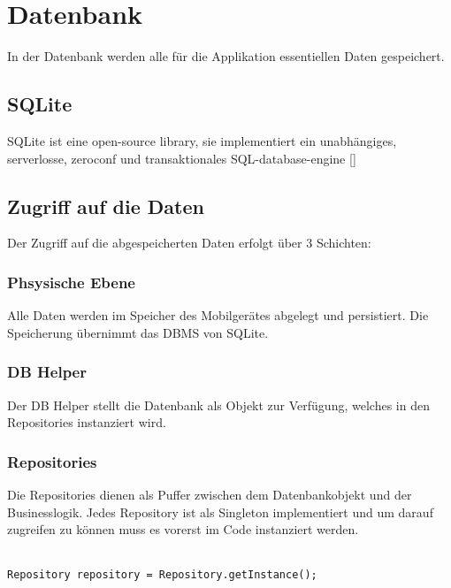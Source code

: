 \documentclass[FIPLY_base.tex]{subfiles}
\begin{document}
\section{Datenbank}

In der Datenbank werden alle für die Applikation essentiellen Daten gespeichert.

\subsection{SQLite}
SQLite ist eine open-source library, sie implementiert ein unabhängiges, serverlosse, zeroconf und transaktionales SQL-database-engine [\cite{dbSQLite}]


\subsection{Zugriff auf die Daten}
Der Zugriff auf die abgespeicherten Daten erfolgt über 3 Schichten:

\subsubsection{Phsysische Ebene}
Alle Daten werden im Speicher des Mobilgerätes abgelegt und persistiert. Die Speicherung übernimmt das DBMS von SQLite.

\subsubsection{DB Helper}
Der DB Helper stellt die Datenbank als Objekt zur Verfügung, welches in den Repositories instanziert wird.


\newpage
\subsubsection{Repositories}
Die Repositories dienen als Puffer zwischen dem Datenbankobjekt und der Businesslogik.
Jedes Repository ist als Singleton implementiert und um darauf zugreifen zu können muss es vorerst im Code instanziert werden.
\\\
\begin{lstlisting}
Repository repository = Repository.getInstance();
\end{lstlisting}
\end{document}
